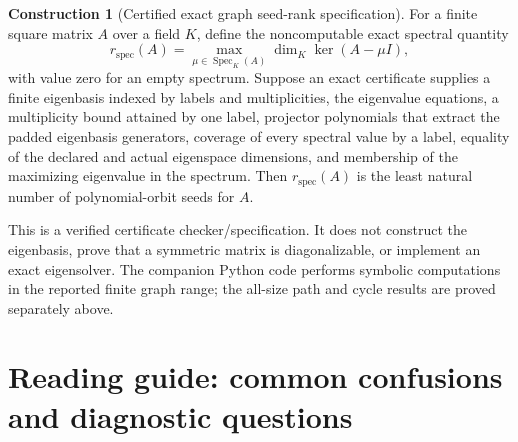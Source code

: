 \documentclass[11pt]{article}
\newcommand{\Spec}{\operatorname{Spec}}\newcommand{\rank}{\operatorname{rank}}\newcommand{\diag}{\operatorname{diag}}
\theoremstyle{definition}
\theoremstyle{remark}
\theoremstyle{definition}\newtheorem{example}[theorem]{Example}
\newtheorem{construction}[theorem]{Construction}
\begin{document}
\begin{construction}[Certified exact graph seed-rank specification]
\label{con:exact-graph-seed-rank}
For a finite square matrix $A$ over a field $K$, define the noncomputable exact
spectral quantity
\[
r_{\mathrm{spec}}(A)
=
\max_{\mu\in\Spec_K(A)}
\dim_K\ker(A-\mu I),
\]
with value zero for an empty spectrum.  Suppose an exact certificate supplies
a finite eigenbasis indexed by labels and multiplicities, the eigenvalue
equations, a multiplicity bound attained by one label, projector polynomials
that extract the padded eigenbasis generators, coverage of every spectral
value by a label, equality of the declared and actual eigenspace dimensions,
and membership of the maximizing eigenvalue in the spectrum.  Then
$r_{\mathrm{spec}}(A)$ is the least natural number of polynomial-orbit seeds
for $A$.

This is a verified certificate checker/specification.  It does not construct
the eigenbasis, prove that a symmetric matrix is diagonalizable, or implement
an exact eigensolver.  The companion Python code performs symbolic
computations in the reported finite graph range; the all-size path and cycle
results are proved separately above.
\end{construction}


\section{Reading guide: common confusions and diagnostic questions}
\end{document}
